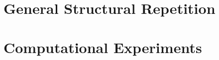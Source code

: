 \part{General Structural Repetition}
    
    
    

\cleardoublepage
\part{Computational Experiments}
    
    
    

\cleardoublepage
{}

% 
% 
% 


